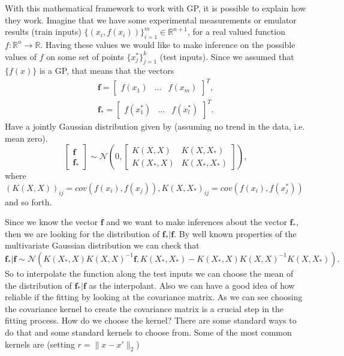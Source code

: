 \documentclass[12pt]{book}
\begin{document}
With this  mathematical framework to work with GP, it is possible to explain how
they work. Imagine that we have some experimental measurements or emulator results (train inputs) 
$\{(x_{i},f(x_{i}))\}_{i=1}^{m}\in\mathbb{R}^{n+1}$,
for a real valued function $f:\mathbb{R}^{n}\longrightarrow\mathbb{R}$. Having these values 
we would like to make inference on the possible values of $f$ on some set of points $\{x_{j}^{*}\}_{j=1}^{k}$ (test inputs).
Since we assumed  that $\{f(x)\}$ is a GP, that means that the vectors
\begin{eqnarray*}
\textbf{f}=\begin{bmatrix}f(x_{1}) & \ldots & f(x_{m}) \end{bmatrix}^{T}, \\
\textbf{f}_{*}=\begin{bmatrix}f(x_{1}^{*}) & \ldots & f(x_{l}^{*}) \end{bmatrix}^{T}.
\end{eqnarray*}
Have a  jointly Gaussian distribution given by  (assuming no trend in the data, i.e. mean zero).
\begin{equation}\label{eqnconditional}
\begin{bmatrix}
\textbf{f} \\
\textbf{f}_{*}
\end{bmatrix}\sim\mathscr{N}\left(0,\begin{bmatrix} K(X,X) & K(X,X_{*}) \\
						    K(X_{*},X) & K(X_{*},X_{*}) \end{bmatrix}
\right),
\end{equation}	
where $(K(X,X))_{ij}=cov(f(x_{i}),f(x_{j})), K(X,X_{*})_{ij}=cov(f(x_{i}),f(x_{j}^{*}))$ and so forth.


Since we know the vector $\textbf{f}$ and we want to make inferences about the vector $\textbf{f}_{*}$,
then we are looking for the distribution of $\textbf{f}_{*}|\textbf{f}$. By well known properties
of the multivariate Gaussian distribution we can check that \cite{lifshits2013gaussian}
\begin{equation}\label{eqnformulameancovariance}
\textbf{f}_{*}|\textbf{f}\sim\mathscr{N}\left(K(X_{*},X)K(X,X)^{-1}\textbf{f},
K(X_{*},X_{*})-K(X_{*},X)K(X,X)^{-1}K(X,X_{*})\right).
\end{equation}
So to interpolate the function along the test inputs we can choose the mean  of the distribution
of $\textbf{f}_{*}|\textbf{f}$ as the interpolant. Also we can have a good idea of how reliable if the fitting
by looking at the covariance matrix. As we can see choosing the covariance kernel to create
the covariance matrix is a crucial step in the fitting process. How do we choose the kernel?
There are some standard ways to do that and some standard kernels to choose from.
Some of the most common kernels are (setting $r=\|x-x'\|_{2}$)
\end{document}
